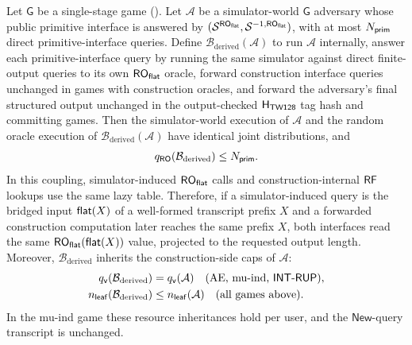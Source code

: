\begin{lemma}
\label{lem:derived-adversary}
Let $\mathsf{G}$ be a single-stage \TW{} game
(). Let
$\mathcal{A}$ be a
simulator-world $\mathsf{G}$ adversary whose public primitive
interface is answered by
$(\mathcal{S}^{\mathsf{RO}_{\mathsf{flat}}}, \mathcal{S}^{-1,\mathsf{RO}_{\mathsf{flat}}})$, with at most $N_{\mathsf{prim}}$ direct
primitive-interface queries. Define
$\mathcal{B}_{\mathrm{derived}}(\mathcal{A})$ to run $\mathcal{A}$
internally, answer each primitive-interface query by running the
same simulator against direct finite-output queries to its own
$\mathsf{RO}_{\mathsf{flat}}$ oracle, forward construction interface queries unchanged in games
with construction oracles, and forward the adversary's final structured output
unchanged in the output-checked $\mathsf{H}_{\mathsf{TW128}}$ tag hash and committing games. Then the
simulator-world execution of $\mathcal{A}$ and the random oracle execution of
$\mathcal{B}_{\mathrm{derived}}(\mathcal{A})$ have identical joint
distributions, and
\[
  q_{\mathsf{RO}}(\mathcal{B}_{\mathrm{derived}}) \leq N_{\mathsf{prim}}.
\]
In this coupling, simulator-induced $\mathsf{RO}_{\mathsf{flat}}$ calls and
construction-internal $\mathsf{RF}$ lookups use the same lazy table. Therefore,
if a simulator-induced query is the bridged input $\mathsf{flat}(X)$ of a
well-formed \TW{} transcript prefix $X$ and a forwarded construction
computation later reaches the same prefix $X$, both interfaces read the
same $\mathsf{RO}_{\mathsf{flat}}(\mathsf{flat}(X))$ value, projected to the requested output
length.
Moreover, $\mathcal{B}_{\mathrm{derived}}$ inherits the construction-side
caps of $\mathcal{A}$:
\begin{align*}
  q_{\mathsf{v}}(\mathcal{B}_{\mathrm{derived}}) &= q_{\mathsf{v}}(\mathcal{A})
    \quad\text{(AE, mu-ind, \textsf{INT-RUP})}, \\
  n_{\mathsf{leaf}}(\mathcal{B}_{\mathrm{derived}}) &\leq n_{\mathsf{leaf}}(\mathcal{A})
    \quad\text{(all games above)}.
\end{align*}
In the mu-ind game these resource inheritances hold per user, and the
$\mathsf{New}$-query transcript is unchanged.
\end{lemma}

